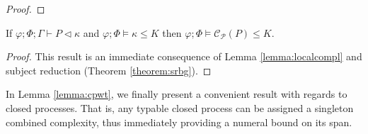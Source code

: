 \begin{lemma}
\begin{proof}


\end{proof}
\end{lemma}


\begin{corollary}\label{theorem:bpcbg}
If $\varphi;\Phi;\Gamma\vdash P \triangleleft \kappa$ and $\varphi;\Phi\vDash \kappa \leq K$ then $\varphi;\Phi\vDash \mathcal{C}_\mathcal{P}(P) \leq K$.
\begin{proof}
    This result is an immediate consequence of Lemma \ref{lemma:localcompl} and subject reduction (Theorem \ref{theorem:srbg}). 
\end{proof}
\end{corollary}

In Lemma \ref{lemma:cpwt}, we finally present a convenient result with regards to closed processes. That is, any typable closed process can be assigned a singleton combined complexity, thus immediately providing a numeral bound on its span. 

